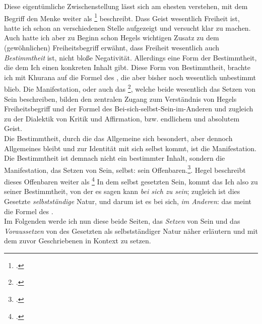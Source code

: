 \documentclass[12pt, a4paper, openany]{report}
\begin{document}
Diese eigentümliche Zwischenstellung lässt sich am ehesten verstehen, mit dem Begriff den Menke weiter als \footcite[][140]{menke_autonomie_2018} beschreibt. 
Dass Geist wesentlich Freiheit ist, hatte ich schon an verschiedenen Stelle aufgezeigt und versucht klar zu machen.
Auch hatte ich aber zu Beginn schon Hegels wichtigen Zusatz zu dem (gewöhnlichen) Freiheitsbegriff erwähnt, dass Freiheit wesentlich auch \emph{Bestimmtheit} ist, nicht bloße Negativität.
Allerdings eine Form der Bestimmtheit, die dem Ich einen konkreten Inhalt gibt.
Diese Form von Bestimmtheit, brachte ich mit Khurana auf die Formel des , die aber bisher noch wesentlich unbestimmt blieb.
Die Manifestation, oder auch das \footcite[][§ 384, S. 29.]{hegel_enzyklopädie_1969}, welche beide wesentlich das Setzen von Sein beschreiben, bilden den zentralen Zugang zum Verständnis von Hegels Freiheitsbegriff und der Formel des Bei-sich-selbst-Sein-im-Anderen und zugleich zu der Dialektik von Kritik und Affirmation, bzw. endlichem und absolutem Geist.\\
Die Bestimmtheit, durch die das Allgemeine sich besondert, aber dennoch Allgemeines bleibt und zur Identität mit sich selbst kommt, ist die Manifestation. 
Die Bestimmtheit ist demnach nicht ein bestimmter Inhalt, sondern die Manifestation, das Setzen von Sein, selbst: sein Offenbaren.\footcite[Vgl.][§ 383, S. 27]{hegel_enzyklopädie_1969}. 
Hegel beschreibt dieses Offenbaren weiter als \footcite[][§ 384, S. 29]{menke_autonomie_2018} 
In dem selbst gesetzten Sein, kommt das Ich also zu seiner Bestimmtheit, von der es sagen kann \emph{bei sich zu sein}; zugleich ist dies Gesetzte \emph{selbstständige} Natur, und darum ist es bei sich, \emph{im Anderen}: das meint die Formel des .\\
Im Folgenden werde ich nun diese beide Seiten, das \emph{Setzen} von Sein und das \emph{Voraussetzen} von des Gesetzten als selbstständiger Natur näher erläutern und mit dem zuvor Geschriebenen in Kontext zu setzen.\\
\end{document}

